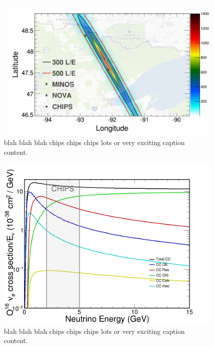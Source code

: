 \begin{figure}
    \includegraphics[width=\largefigwidth]{diagrams/cvn/numi_map}
    \caption[numi_map]%
    {blah blah blah chips chips chips lots or very exciting caption content.}
    \label{fig:numi_map}
\end{figure}

\begin{figure}
    \includegraphics[width=\largefigwidth]{diagrams/cvn/xsec_cc_nu_e_O16}
    \caption[xsec_cc_nu_e_O16]%
    {blah blah blah chips chips chips lots or very exciting caption content.}
    \label{fig:xsec_cc_nu_e_O16}
\end{figure}

